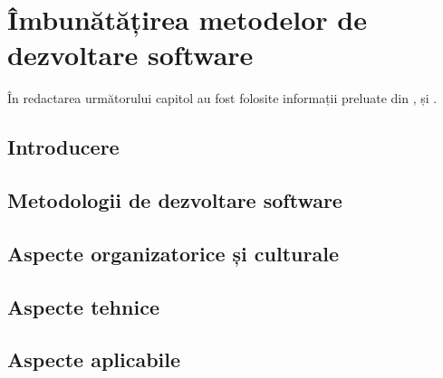 \chapter{Îmbunătățirea metodelor de dezvoltare software}
În redactarea următorului capitol au fost folosite informații preluate din
\cite{davis_daniels_2016}, \cite{devops_handbook} și \cite{freeman_2019}.
\section{Introducere}

\section{Metodologii de dezvoltare software}

\section{Aspecte organizatorice și culturale}

\section{Aspecte tehnice}

\section{Aspecte aplicabile}
